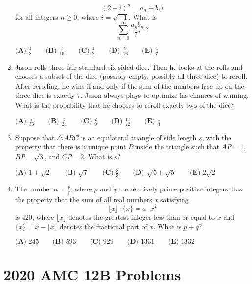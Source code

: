 \documentclass{article}
\begin{document}
\begin{enumerate}[label=\arabic*., itemsep=0.5em]
\begin{equation*}
(2 + i)^n = a_n + b_ni
\end{equation*}
for all integers \(n\geq 0\), where \(i = \sqrt{-1}\). What is
\begin{equation*}
\sum_{n=0}^\infty\frac{a_nb_n}{7^n}\,?
\end{equation*}

\(\textbf{(A) }\frac 38\qquad\textbf{(B) }\frac7{16}\qquad\textbf{(C) }\frac12\qquad\textbf{(D) }\frac9{16}\qquad\textbf{(E) }\frac47\)\par \vspace{0.5em}\item Jason rolls three fair standard six-sided dice. Then he looks at the rolls and chooses a subset of the dice (possibly empty, possibly all three dice) to reroll. After rerolling, he wins if and only if the sum of the numbers face up on the three dice is exactly \(7\). Jason always plays to optimize his chances of winning. What is the probability that he chooses to reroll exactly two of the dice?

\(\textbf{(A) } \frac{7}{36} \qquad\textbf{(B) } \frac{5}{24} \qquad\textbf{(C) } \frac{2}{9} \qquad\textbf{(D) } \frac{17}{72} \qquad\textbf{(E) } \frac{1}{4}\)\par \vspace{0.5em}\item Suppose that \(\triangle ABC\) is an equilateral triangle of side length \(s\), with the property that there is a unique point \(P\) inside the triangle such that \(AP = 1\), \(BP = \sqrt{3}\), and \(CP = 2\). What is \(s?\)

\(\textbf{(A) } 1 + \sqrt{2} \qquad \textbf{(B) } \sqrt{7} \qquad \textbf{(C) } \frac{8}{3} \qquad \textbf{(D) } \sqrt{5 + \sqrt{5}} \qquad \textbf{(E) } 2\sqrt{2}\)\par \vspace{0.5em}\item The number \(a = \tfrac{p}{q}\), where \(p\) and \(q\) are relatively prime positive integers, has the property that the sum of all real numbers \(x\) satisfying
\begin{equation*}
\lfloor x \rfloor \cdot \{x\} = a \cdot x^2
\end{equation*}
is \(420\), where \(\lfloor x \rfloor\) denotes the greatest integer less than or equal to \(x\) and \(\{x\} = x - \lfloor x \rfloor\) denotes the fractional part of \(x\). What is \(p + q?\)

\(\textbf{(A) } 245 \qquad \textbf{(B) } 593 \qquad \textbf{(C) } 929 \qquad \textbf{(D) } 1331 \qquad \textbf{(E) } 1332\)\par \vspace{0.5em}
\end{enumerate}
\newpage\section*{2020 AMC 12B Problems}
\end{document}

